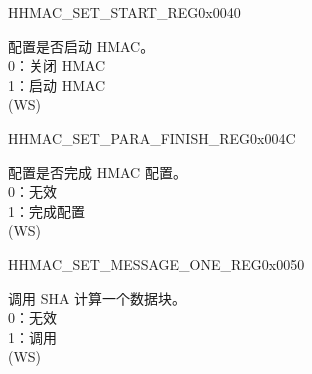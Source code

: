 \begin{register}{H}{HMAC\_SET\_START\_REG}{0x0040}\label{regdesc:HMACSETSTARTREG}
    \regnewline%
    \begin{regdesc}\begin{reglist}
    \label{fielddesc:HMACSETSTART}\item [HMAC\_SET\_START] 配置是否启动 HMAC。
    \\0：关闭 HMAC
    \\1：启动 HMAC
    \\(WS)
    \end{reglist}\end{regdesc}
    \end{register}


    \begin{register}{H}{HMAC\_SET\_PARA\_FINISH\_REG}{0x004C}\label{regdesc:HMACSETPARAFINISHREG}
    \regnewline%
    \begin{regdesc}\begin{reglist}
    \label{fielddesc:HMACSETPARAEND}\item [HMAC\_SET\_PARA\_END] 配置是否完成 HMAC 配置。
    \\0：无效
    \\1：完成配置 
    \\(WS)
    \end{reglist}\end{regdesc}
    \end{register}


    \begin{register}{H}{HMAC\_SET\_MESSAGE\_ONE\_REG}{0x0050}\label{regdesc:HMACSETMESSAGEONEREG}
    \regnewline%
    \begin{regdesc}\begin{reglist}
    \label{fielddesc:HMACSETTEXTONE}\item [HMAC\_SET\_TEXT\_ONE] 调用 SHA 计算一个数据块。
    \\0：无效
    \\1：调用
    \\(WS)
    \end{reglist}\end{regdesc}
    \end{register}


